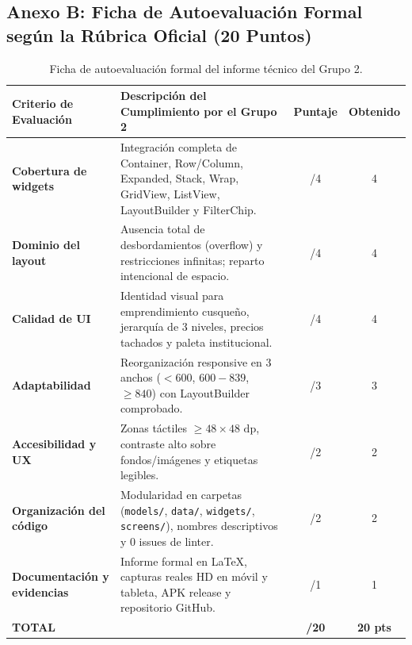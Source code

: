 \documentclass[12pt,a4paper]{article}
\begin{document}
\subsection{Anexo B: Ficha de Autoevaluación Formal según la Rúbrica Oficial (20 Puntos)}

\begin{table}[H]
\centering
\begin{tabularx}{\textwidth}{@{}lXcc@{}}
\toprule
\textbf{Criterio de Evaluación} & \textbf{Descripción del Cumplimiento por el Grupo 2} & \textbf{Puntaje} & \textbf{Obtenido} \\ \midrule
\textbf{Cobertura de widgets} & Integración completa de Container, Row/Column, Expanded, Stack, Wrap, GridView, ListView, LayoutBuilder y FilterChip. & /4 & 4 \\ \addlinespace
\textbf{Dominio del layout} & Ausencia total de desbordamientos (overflow) y restricciones infinitas; reparto intencional de espacio. & /4 & 4 \\ \addlinespace
\textbf{Calidad de UI} & Identidad visual para emprendimiento cusqueño, jerarquía de 3 niveles, precios tachados y paleta institucional. & /4 & 4 \\ \addlinespace
\textbf{Adaptabilidad} & Reorganización responsive en 3 anchos ($<600$, $600-839$, $\ge 840$) con LayoutBuilder comprobado. & /3 & 3 \\ \addlinespace
\textbf{Accesibilidad y UX} & Zonas táctiles $\ge 48 \times 48\text{ dp}$, contraste alto sobre fondos/imágenes y etiquetas legibles. & /2 & 2 \\ \addlinespace
\textbf{Organización del código} & Modularidad en carpetas (\texttt{models/}, \texttt{data/}, \texttt{widgets/}, \texttt{screens/}), nombres descriptivos y 0 issues de linter. & /2 & 2 \\ \addlinespace
\textbf{Documentación y evidencias} & Informe formal en LaTeX, capturas reales HD en móvil y tableta, APK release y repositorio GitHub. & /1 & 1 \\ \midrule
\textbf{TOTAL} & & \textbf{/20} & \textbf{20 pts} \\ \bottomrule
\end{tabularx}
\caption{Ficha de autoevaluación formal del informe técnico del Grupo 2.}
\end{table}
\end{document}
